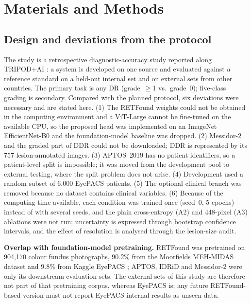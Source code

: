 \documentclass[11pt,a4paper]{article}
\begin{document}
\section{Materials and Methods}\label{sec:mm}
\subsection{Design and deviations from the protocol}
The study is a retrospective diagnostic-accuracy study reported along TRIPOD+AI \cite{collins2024}: a system is developed on one source and evaluated against a reference standard on a held-out internal set and on external sets from other countries. The primary task is any DR (grade~$\geq$1 vs.\ grade~0); five-class grading is secondary. Compared with the planned protocol, six deviations were necessary and are stated here. (1) The RETFound weights could not be obtained in the computing environment and a ViT-Large cannot be fine-tuned on the available CPU, so the proposed head was implemented on an ImageNet EfficientNet-B0 \cite{tan2019} and the foundation-model baseline was dropped. (2) Messidor-2 and the graded part of DDR could not be downloaded; DDR is represented by its 757 lesion-annotated images. (3) APTOS~2019 has no patient identifiers, so a patient-level split is impossible; it was moved from the development pool to external testing, where the split problem does not arise. (4) Development used a random subset of 6{,}000 EyePACS patients. (5) The optional clinical branch was removed because no dataset contains clinical variables. (6) Because of the computing time available, each condition was trained once (seed~0, 5 epochs) instead of with several seeds, and the plain cross-entropy (A2) and 448-pixel (A3) ablations were not run; uncertainty is expressed through bootstrap confidence intervals, and the effect of resolution is analysed through the lesion-size audit.

\textbf{Overlap with foundation-model pretraining.} RETFound was pretrained on 904{,}170 colour fundus photographs, 90.2\% from the Moorfields MEH-MIDAS dataset and 9.8\% from Kaggle EyePACS \cite{zhou2023}; APTOS, IDRiD and Messidor-2 were only its downstream evaluation sets. The external sets of this study are therefore not part of that pretraining corpus, whereas EyePACS is; any future RETFound-based version must not report EyePACS internal results as unseen data.
\end{document}
